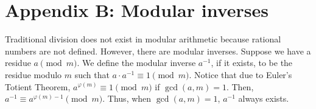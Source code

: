 \documentclass{article}
\newcommand{\p}{\varphi}
\begin{document}

\section{Appendix B: Modular inverses}
Traditional division does not exist in modular arithmetic because rational numbers are not defined. However, there are modular inverses. Suppose we have a residue $a \pmod m$. We define the modular inverse $a^{-1}$, if it exists, to be the residue modulo $m$ such that $a \cdot a^{-1} \equiv 1 \pmod m$. Notice that due to Euler's Totient Theorem, $a^{\p(m)} \equiv 1 \pmod m$ if $\gcd(a, m) = 1$. Then, $a^{-1} \equiv a^{\p(m)-1} \pmod m$. Thus, when $\gcd(a,m)=1$, $a^{-1}$ always exists.
\end{document}
